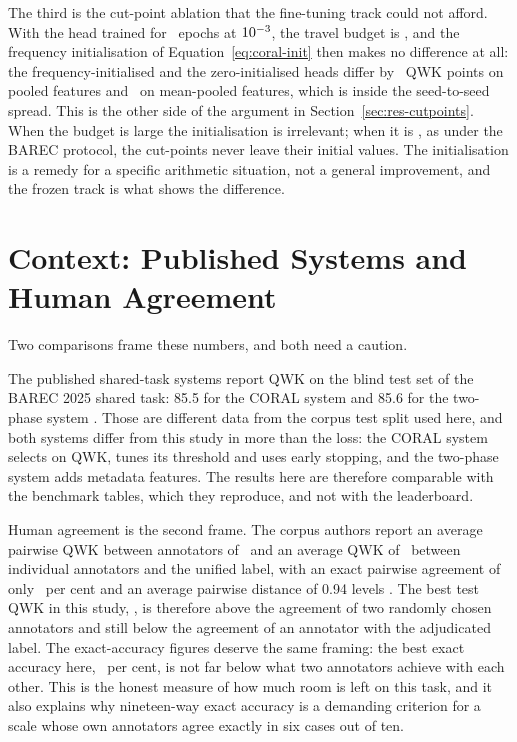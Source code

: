 The third is the cut-point ablation that the fine-tuning track could not afford. With the head
trained for \cpuEpochs\ epochs at $10^{-3}$, the travel budget is \cpuLrSum, and the
frequency initialisation of Equation~\ref{eq:coral-init} then makes no difference at all:
the frequency-initialised and the zero-initialised heads differ by \cpuZeroInitDiffPooler\ QWK
points on pooled features and \cpuZeroInitDiffMean\ on mean-pooled features, which is inside
the seed-to-seed spread. This is the other side of
the argument in Section~\ref{sec:res-cutpoints}. When the budget is large the initialisation is
irrelevant; when it is \lrSumEncoder, as under the BAREC protocol, the cut-points never leave
their initial values. The initialisation is a remedy for a specific arithmetic situation, not a
general improvement, and the frozen track is what shows the difference.

\section{Context: Published Systems and Human Agreement}
\label{sec:res-context}

Two comparisons frame these numbers, and both need a caution.

The published shared-task systems report QWK on the blind test set of the BAREC 2025 shared
task: 85.5 for the CORAL system and 85.6 for the two-phase system
\cite{nazzal2025zai,trigui2025stbw}. Those are different data from the corpus test split used
here, and both systems differ from this study in more than the loss: the CORAL system selects
on QWK, tunes its threshold and uses early stopping, and the two-phase system adds metadata
features. The results here are therefore comparable with the benchmark tables, which they
reproduce, and not with the leaderboard.

Human agreement is the second frame. The corpus authors report an average pairwise QWK between
annotators of \iaaPairwiseQwk\ and an average QWK of \iaaUnifiedQwk\ between individual
annotators and the unified label, with an exact pairwise agreement of only
\iaaPairwiseAcc\ per cent and an average pairwise distance of 0.94 levels
\cite{elmadani2025barec}. The best test QWK in this study, \testQwkCoralHeadlr, is therefore
above the agreement of two randomly chosen annotators and still below the agreement of an
annotator with the adjudicated label. The exact-accuracy figures deserve the same framing: the
best exact accuracy here, \testAccSoftFive\ per cent, is not far below what two annotators
achieve with each other. This is the honest measure of how much room is left on this task, and
it also explains why nineteen-way exact accuracy is a demanding criterion for a scale whose own
annotators agree exactly in six cases out of ten.

